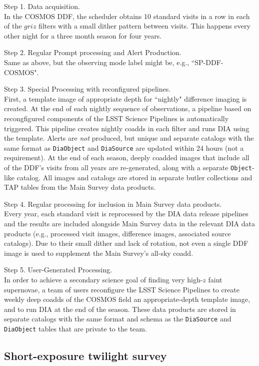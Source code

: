Step 1. Data acquisition. \\
In the COSMOS DDF, the scheduler obtains 10 standard visits in a row in each of the $griz$ filters
with a small dither pattern between visits.
This happens every other night for a three month season for four years.

Step 2. Regular Prompt processing and Alert Production. \\
Same as above, but the observing mode label might be, e.g., ``SP-DDF-COSMOS".

Step 3. Special Processing with reconfigured pipelines. \\
First, a template image of appropriate depth for ``nightly" difference imaging is created.
At the end of each nightly sequence of observations, a pipeline based on recongfigured 
components of the LSST Science Pipelines is automatically triggered.
This pipeline creates nightly coadds in each filter and runs DIA using the template.
Alerts are \emph{not} produced, but unique and separate catalogs with the same format
as {\tt DiaObject} and {\tt DiaSource} are updated within 24 hours (not a requirement).
At the end of each season, deeply coadded images that include all of the DDF's visits 
from all years are re-generated, along with a separate {\tt Object}-like catalog.
All images and catalogs are stored in separate butler collections and TAP tables from
the Main Survey data products.

Step 4. Regular processing for inclusion in Main Survey data products. \\
Every year, each standard visit is reprocessed by the DIA data release pipelines
and the results are included alongside Main Survey data in the relevant DIA data products
(e.g., processed visit images, difference images, associated source catalogs).
Due to their small dither and lack of rotation, not even a single DDF image 
is used to supplement the Main Survey's all-sky coadd.

Step 5. User-Generated Processing. \\
In order to achieve a secondary science goal of finding very high-$z$ faint supernovae,
a team of users reconfigure the LSST Science Pipelines to create weekly deep coadds
of the COSMOS field an appropriate-depth template image, and to run DIA at the
end of the season.
These data products are stored in separate catalogs with the same format and schema as
the {\tt DiaSource} and {\tt DiaObject} tables that are private to the team.


\subsection{Short-exposure twilight survey}\label{ssec:SPCS_Twilight}

